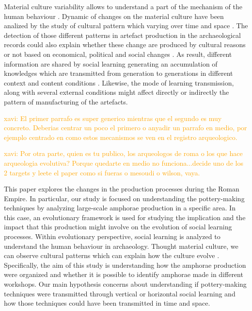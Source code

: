 \documentclass[review]{elsarticle}
\newcommand{\memo}[2]{\textcolor{#1}{#2}}
\newcommand{\xavi}[1]{\memo{orange}{xavi: #1\\}}
\begin{document}
Material culture variability allows to understand a part of the mechanism of the human behaviour \citep{richerson2005not, schillinger_copying_2016}. Dynamic of changes on the material culture have been analized by the study of cultural pattern which varying over time and space \citep{eerkens_jelmer_cultural_2007, lycett_cultural_2015}. The detection of those  different patterns in artefact production in the archaeological records could also explain whether these change are produced by cultural reasons or not based on economical, political and social changes \citep{basalla1988evolution}. As result, different information are shared by social learning generating an accumulation of knowledges which are transmitted from generation to generations in different context and content conditions  \citep{eerkens_jelmer_cultural_2005, neff1992ceramics,henrich_evolution_2003, boyd_cultural_2011}. Likewise, the mode of learning transmission, along with several external conditions might affect directly or indirectly the pattern of manufacturing of the artefacts. 

\xavi{El primer parrafo es super generico mientras que el segundo es muy concreto. Deberias centrar un poco el primero o anyadir un parrafo en medio, por ejemplo centrado en como estos mecanismos se ven en el registro arqueologico.}

\xavi{Por otra parte, quien es tu publico, los arqueologos de roma o los que hace arqueologia evolutiva? Porque quedarte en medio no funciona...decide uno de los 2 targets y leete el paper como si fueras o mesoudi o wilson, vaya.}

This paper explores the changes in the production processes during the Roman Empire. In particular, our study is focused on understanding the pottery-making techniques by analyzing large-scale amphorae production in a specific area. In this case, an evolutionary framework is used for studying the implication and the impact that this production might involve on the  evolution of social learning processes.  Within evolutionary perspective, social learning is analyzed to understand the human behaviour in archaeology. Thought material culture, we can observe cultural patterns which can explain how the culture evolve \citep{richerson2005not}. Specifically, the aim of this study is understanding how the amphorae production were organized and whether it is possible to identify amphorae made in different workshops. Our main hypothesis concerns about understanding if pottery-making techniques were transmitted through vertical or horizontal social learning and how those techniques could have been transmitted in time and space. 
\end{document}
